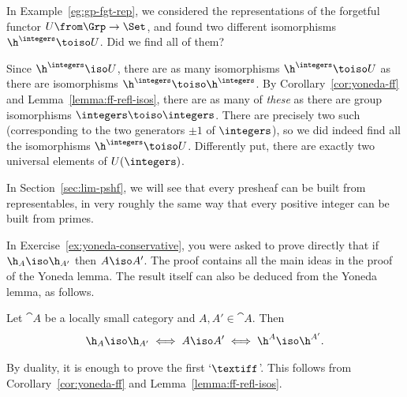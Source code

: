 \begin{example}
In Example~\ref{eg:gp-fgt-rep}, we considered the representations of the
forgetful functor $U\from \Grp \to \Set$,%
%
%
and found two different isomorphisms\linebreak $\h^\integers \toiso U$.%
%
%
Did we find all of them?

Since $\h^\integers \iso U$, there are as many isomorphisms $\h^\integers
\toiso U$ as there are isomorphisms $\h^\integers \toiso \h^\integers$.  By
Corollary~\ref{cor:yoneda-ff} and
Lemma~\ref{lemma:ff-refl-isos}, there are
as many of \emph{these} as there are group isomorphisms $\integers \toiso
\integers$.  There are precisely two such (corresponding to the two
generators $\pm 1$ of $\integers$), so we did indeed find all the
isomorphisms $\h^\integers \toiso U$.  Differently put, there are exactly
two universal elements of $U(\integers)$.
\end{example}

In Section~\ref{sec:lim-pshf}, we will see that every presheaf can be built
from representables, in very roughly the same way that every positive
integer can be built from primes.%
%
%


%
%

In Exercise~\ref{ex:yoneda-conservative}, you were asked to prove directly
that if $\h_A \iso \h_{A'}$ then $A \iso A'$.  The proof contains all the
main ideas in the proof of the Yoneda lemma.  The result itself can also be
deduced from the Yoneda lemma, as follows.

\begin{cor}
\label{cor:reps-unique}
Let $\cat{A}$ be a locally small category and $A, A' \in \cat{A}$.  Then
\[
\h_A \iso \h_{A'}
\iff
A \iso A'
\iff
\h^A \iso \h^{A'}.
\]
\end{cor}

\begin{pf}
By duality, it is enough to prove the first `$\textiff$'.  This follows from 
Corollary~\ref{cor:yoneda-ff} and
Lemma~\ref{lemma:ff-refl-isos}.  
\end{pf}

